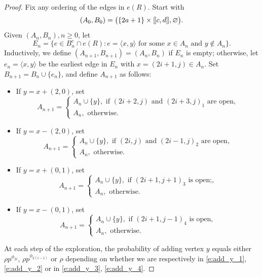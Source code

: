 \documentclass[a4paper,oneside,12pt]{amsart}
\def\llbracket{[\hspace{-.10em} [ }
\def\rrbracket{ ] \hspace{-.10em}]}
\renewcommand{\geq}{\geqslant}
\theoremstyle{plain}
\theoremstyle{definition}
\theoremstyle{remark}
\begin{document}
\begin{proof}
Fix any ordering of the edges in $e(R)$.
Start with 
\begin{equation*}
(A_0,B_0) = \big( \{2a+1\} \times \llbracket c,d \rrbracket, \varnothing \big).
\end{equation*}
Given $(A_n,B_n), n \geq 0$, let
\begin{equation*}
E_n = \{ e \in B_n^c \cap e(R) \colon e = \langle x,y \rangle \textrm{ for some } x \in A_n \textrm{ and } y \notin A_n\}.
\end{equation*}
Inductively, we define  $(A_{n+1},B_{n+1}) = (A_n,B_n)$ if $E_n$ is empty; otherwise, let $e_n = \langle x,y \rangle$ be the earliest edge in $E_n$ with $x = (2i+1, j) \in A_n$.
Set $B_{n+1} = B_n \cup \{e_n\}$, and define $A_{n+1}$ as follows:
\begin{itemize}
\item If $y = x+(2,0)$, set 
\begin{equation}
\label{e:add_y_1}
A_{n+1} =
\begin{cases}
 A_n \cup \{y\}, \textrm{ if $(2i+2, j)$ and $(2i+3,j)_1$ are open,} \\
A_n, \textrm{ otherwise.}
\end{cases}
\end{equation}
\item If $y = x-(2,0)$, set 
\begin{equation}
\label{e:add_y_2}
A_{n+1} =
\begin{cases}
 A_n \cup \{y\}, \textrm{ if $(2i, j)$ and $(2i-1,j)_2$ are open,} \\
A_n, \textrm{ otherwise.}
\end{cases}
\end{equation}
\item If $y = x+(0,1)$, set
\begin{equation}
\label{e:add_y_3}
A_{n+1} =
\begin{cases}
 A_n \cup \{y\}, \textrm{ if $(2i+1, j+1)_3$ is open;,} \\
A_n, \textrm{ otherwise.}
\end{cases}
\end{equation}
\item If $y = x-(0,1)$, set
\begin{equation}
\label{e:add_y_4}
A_{n+1} =
\begin{cases}
 A_n \cup \{y\}, \textrm{ if $(2i+1, j-1)_4$ is open,} \\
A_n, \textrm{ otherwise.}
\end{cases}
\end{equation}
\end{itemize}
At each step of the exploration, the probability of adding vertex $y$ equals either $\rho p^{\phi_{2i}}$, $\rho p^{\phi_{2(i-1)}}$ or $\rho$ depending on whether we are respectively in \eqref{e:add_y_1}, \eqref{e:add_y_2} or in  \eqref{e:add_y_3}, \eqref{e:add_y_4}.


\end{proof}
\end{document}
